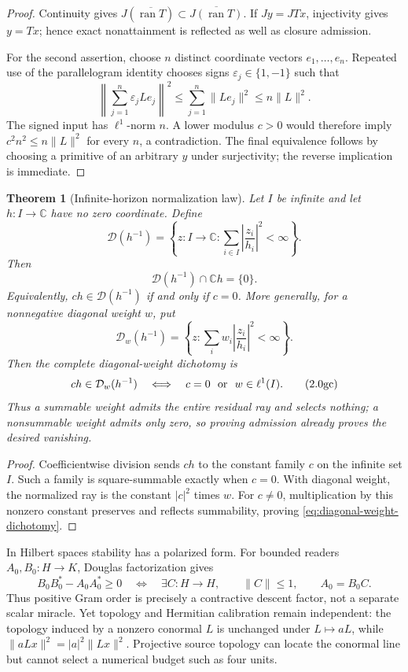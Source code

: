 \documentclass[11pt]{article}
\newtheorem{theorem}{Theorem}[section]
\theoremstyle{definition}
\theoremstyle{remark}
\newcommand{\C}{\mathbb C}
\begin{document}
\begin{proof}
Continuity gives
\(J(\overline{\operatorname{ran}T})\subset
\overline{J(\operatorname{ran}T)}\).  If \(Jy=JTx\), injectivity gives
\(y=Tx\); hence exact nonattainment is reflected as well as closure
admission.

For the second assertion, choose \(n\) distinct coordinate vectors
\(e_1,\ldots,e_n\).  Repeated use of the parallelogram identity chooses
signs \(\varepsilon_j\in\{1,-1\}\) such that
\[
 \left\|\sum_{j=1}^n\varepsilon_jLe_j\right\|^2
 \le\sum_{j=1}^n\|Le_j\|^2\le n\|L\|^2.
\]
The signed input has \(\ell^1\)-norm \(n\).  A lower modulus \(c>0\)
would therefore imply \(c^2n^2\le n\|L\|^2\) for every \(n\), a
contradiction.  The final equivalence follows by choosing a primitive of an
arbitrary \(y\) under surjectivity; the reverse implication is immediate.
\end{proof}

\begin{theorem}[Infinite-horizon normalization law]
\label{thm:infinite-horizon-normalization}
Let \(I\) be infinite and let \(h:I\to\C\) have no zero coordinate.  Define
\[
 \mathcal D(h^{-1})=
 \left\{z:I\to\C:
   \sum_{i\in I}\left|\frac{z_i}{h_i}\right|^2<\infty\right\}.
\]
Then
\[
             \mathcal D(h^{-1})\cap\C h=\{0\}.
\tag{2.0gb}\label{eq:infinite-horizon-normalization}
\]
Equivalently, \(ch\in\mathcal D(h^{-1})\) if and only if \(c=0\).
More generally, for a nonnegative diagonal weight \(w\), put
\[
 \mathcal D_w(h^{-1})=
 \left\{z:\sum_i w_i\left|\frac{z_i}{h_i}\right|^2<\infty\right\}.
\]
Then the complete diagonal-weight dichotomy is
\[
 ch\in\mathcal D_w(h^{-1})
 \quad\Longleftrightarrow\quad
 c=0\ \hbox{ or }\ w\in\ell^1(I).
\tag{2.0gc}\label{eq:diagonal-weight-dichotomy}
\]
Thus a summable weight admits the entire residual ray and selects nothing;
a nonsummable weight admits only zero, so proving admission already proves
the desired vanishing.
\end{theorem}

\begin{proof}
Coefficientwise division sends \(ch\) to the constant family \(c\) on the
infinite set \(I\).  Such a family is square-summable exactly when \(c=0\).
With diagonal weight, the normalized ray is the constant \(|c|^2\) times
\(w\).  For \(c\ne0\), multiplication by this nonzero constant preserves and
reflects summability, proving \eqref{eq:diagonal-weight-dichotomy}.
\end{proof}

In Hilbert spaces stability has a polarized form.  For bounded readers
\(A_0,B_0:H\to K\), Douglas factorization gives
\[
 B_0B_0^*-A_0A_0^*\ge0
 \quad\Longleftrightarrow\quad
 \exists C:H\to H,\qquad \|C\|\le1,\qquad A_0=B_0C.
\tag{2.0h}\label{eq:douglas-descent}
\]
Thus positive Gram order is precisely a contractive descent factor, not a
separate scalar miracle.  Yet topology and Hermitian calibration remain
independent: the topology induced by a nonzero conormal \(L\) is unchanged
under \(L\mapsto aL\), while \(\|aLx\|^2=|a|^2\|Lx\|^2\).  Projective source
topology can locate the conormal line but cannot select a numerical budget
such as four units.
\end{document}
